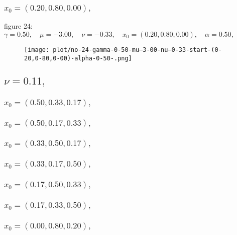 \documentclass[a4paper]{article}
\begin{document}
\begin{multicols*}{2}
   \subsubsection{\(x_0 = (0.20,0.80,0.00),\quad \)}
   
figure 24: \(\gamma = 0.50,\quad \mu = -3.00,\quad \nu = -0.33,\quad x_0 = (0.20,0.80,0.00),\quad \alpha = 0.50,\quad \)
   \begin{figure}[H]
   \centering
   \texttt{[image: plot/no-24-gamma-0-50-mu--3-00-nu--0-33-start-(0-20,0-80,0-00)-alpha-0-50-.png]}
   \end{figure}
   

   \subsection{\(\nu = 0.11,\quad \)}
   

   \subsubsection{\(x_0 = (0.50,0.33,0.17),\quad \)}
   

   \subsubsection{\(x_0 = (0.50,0.17,0.33),\quad \)}
   

   \subsubsection{\(x_0 = (0.33,0.50,0.17),\quad \)}
   

   \subsubsection{\(x_0 = (0.33,0.17,0.50),\quad \)}
   

   \subsubsection{\(x_0 = (0.17,0.50,0.33),\quad \)}
   

   \subsubsection{\(x_0 = (0.17,0.33,0.50),\quad \)}
   

   \subsubsection{\(x_0 = (0.00,0.80,0.20),\quad \)}
   


\end{multicols*}
\end{document}
